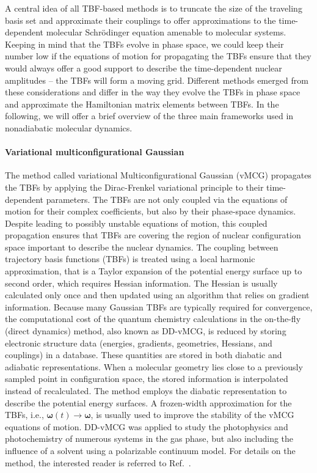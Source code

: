 \documentclass[9pt,bestpractices,pubversion]{livecoms}
\begin{document}
A central idea of all TBF-based methods is to truncate the size of the traveling basis set and approximate their couplings to offer approximations to the time-dependent molecular Schr\"odinger equation amenable to molecular systems. Keeping in mind that the TBFs evolve in phase space, we could keep their number low if the equations of motion for propagating the TBFs ensure that they would always offer a good support to describe the time-dependent nuclear amplitudes -- the TBFs will form a moving grid. Different methods emerged from these considerations and differ in the way they evolve the TBFs in phase space and approximate the Hamiltonian matrix elements between TBFs. In the following, we will offer a brief overview of the three main frameworks used in nonadiabatic molecular dynamics. 

\paragraph{Variational multiconfigurational Gaussian}
The method called variational Multiconfigurational Gaussian (vMCG) propagates the TBFs by applying the Dirac-Frenkel variational principle to their time-dependent parameters.\cite{worth2004novel,lasorne2006direct,lasorne2007direct,worth2008solving,doi:10.1098/rsta.2020.0386,doi:https://doi.org/10.1002/9781119417774.ch13} The TBFs are not only coupled via the equations of motion for their complex coefficients, but also by their phase-space dynamics. Despite leading to possibly unstable equations of motion, this coupled propagation ensures that TBFs are covering the region of nuclear configuration space important to describe the nuclear dynamics. The coupling between trajectory basis functions (TBFs) is treated using a local harmonic approximation, that is a Taylor expansion of the potential energy surface up to second order, which requires Hessian information. The Hessian is usually calculated only once and then updated using an algorithm that relies on gradient information. Because many Gaussian TBFs are typically required for convergence, the computational cost of the quantum chemistry calculations in the on-the-fly (direct dynamics) method, also known as DD-vMCG, is reduced by storing electronic structure data (energies, gradients, geometries, Hessians, and couplings) in a database. These quantities are stored in both diabatic and adiabatic representations. When a molecular geometry lies close to a previously sampled point in configuration space, the stored information is interpolated instead of recalculated. The method employs the diabatic representation to describe the potential energy surfaces.\cite{10.1063/5.0043720} A frozen-width approximation for the TBFs, i.e., $\boldsymbol{\omega}(t) \rightarrow \boldsymbol{\omega}$, is usually used to improve the stability of the vMCG equations of motion\cite{mendive2012towards}. DD-vMCG was applied to study the photophysics and photochemistry of numerous systems in the gas phase, but also including the influence of a solvent using a polarizable continuum model.\cite{D1CP01843D,molecules26237247} For details on the method, the interested reader is referred to Ref.~.
\end{document}
